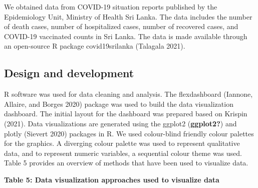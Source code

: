 \documentclass[
]{article}
\begin{document}
We obtained data from COVID-19 situation reports published by the
Epidemiology Unit, Ministry of Health Sri Lanka. The data includes the
number of death cases, number of hospitalized cases, number of recovered
cases, and COVID-19 vaccinated counts in Sri Lanka. The data is made
available through an open-source R package covid19srilanka (Talagala
2021).

\hypertarget{design-and-development}{%
\subsection{Design and development}\label{design-and-development}}

R software was used for data cleaning and analysis. The flexdashboard
(Iannone, Allaire, and Borges 2020) package was used to build the data
visualization dashboard. The initial layout for the dashboard was
prepared based on Krispin (2021). Data visualizations are generated
using the ggplot2 (\textbf{ggplot2?}) and plotly (Sievert 2020) packages
in R. We used colour-blind friendly colour palettes for the graphics. A
diverging colour palette was used to represent qualitative data, and to
represent numeric variables, a sequential colour theme was used. Table 5
provides an overview of methods that have been used to visualize data.

\textbf{Table 5: Data visualization approaches used to visualize data}
\end{document}
